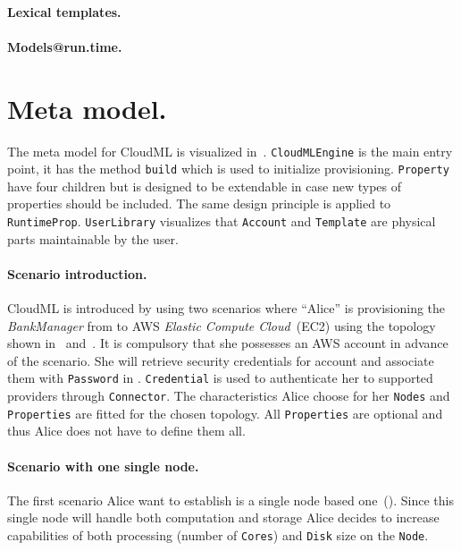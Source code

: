 \paragraph{Lexical templates.}

\paragraph{Models@run.time.}

\section{Meta model.}

The meta model for CloudML is visualized in~. 
\texttt{CloudMLEngine} is the main entry point, it has the method \texttt{build}
which is used to initialize provisioning.
\texttt{Property} have four children but is designed to be extendable in case
new types of properties should be included. The same design principle
is applied to \texttt{RuntimeProp}.
\texttt{UserLibrary} visualizes that \texttt{Account} and \texttt{Template} are 
physical parts maintainable by the user.

\paragraph{Scenario introduction.}
CloudML is introduced by using two scenarios where ``Alice'' is provisioning the 
\emph{BankManager} from  to AWS \emph{Elastic Compute Cloud}~(EC2)
using the topology shown in~ and~.
It is compulsory that she possesses an AWS account in advance of the scenario.
She will retrieve security credentials for account 
and associate them with \texttt{Password} in .
\texttt{Credential} is used to authenticate her to supported providers through \texttt{Connector}.
The characteristics Alice choose for her \texttt{Nodes} and \texttt{Properties} are fitted
for the chosen topology.
All \texttt{Properties} are optional and thus Alice does not have to define them all.

\paragraph{Scenario with one single node.}
The first scenario Alice want to establish is a single node based one~().
Since this single node will handle both computation and storage Alice decides to 
increase capabilities of both processing (number of \texttt{Cores}) and 
\texttt{Disk} size on the \texttt{Node}.

